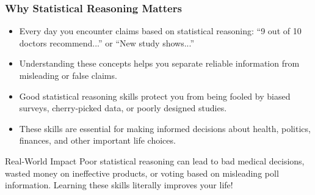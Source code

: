 \documentclass{beamer}
\begin{document}
	\begin{frame}
		\frametitle{Why Statistical Reasoning Matters}
		
		\begin{itemize}
			\item Every day you encounter claims based on statistical reasoning: ``9 out of 10 doctors recommend...'' or ``New study shows...''
			\item Understanding these concepts helps you separate reliable information from misleading or false claims.
			\item Good statistical reasoning skills protect you from being fooled by biased surveys, cherry-picked data, or poorly designed studies.
			\item These skills are essential for making informed decisions about health, politics, finances, and other important life choices.
		\end{itemize}
		
		\begin{alertblock}{Real-World Impact}
			Poor statistical reasoning can lead to bad medical decisions, wasted money on ineffective products, or voting based on misleading poll information. Learning these skills literally improves your life!
		\end{alertblock}
		
	\end{frame}
	
\end{document}
